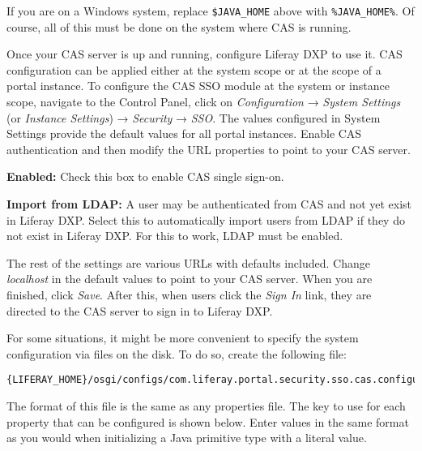 If you are on a Windows system, replace \texttt{\$JAVA\_HOME} above with
\texttt{\%JAVA\_HOME\%}. Of course, all of this must be done on the
system where CAS is running.

Once your CAS server is up and running, configure Liferay DXP to use it.
CAS configuration can be applied either at the system scope or at the
scope of a portal instance. To configure the CAS SSO module at the
system or instance scope, navigate to the Control Panel, click on
\emph{Configuration} → \emph{System Settings} (or \emph{Instance
Settings}) → \emph{Security} → \emph{SSO}. The values configured in
System Settings provide the default values for all portal instances.
Enable CAS authentication and then modify the URL properties to point to
your CAS server.

\textbf{Enabled:} Check this box to enable CAS single sign-on.

\textbf{Import from LDAP:} A user may be authenticated from CAS and not
yet exist in Liferay DXP. Select this to automatically import users from
LDAP if they do not exist in Liferay DXP. For this to work, LDAP must be
enabled.

The rest of the settings are various URLs with defaults included. Change
\emph{localhost} in the default values to point to your CAS server. When
you are finished, click \emph{Save}. After this, when users click the
\emph{Sign In} link, they are directed to the CAS server to sign in to
Liferay DXP.

For some situations, it might be more convenient to specify the system
configuration via files on the disk. To do so, create the following
file:

\begin{verbatim}
{LIFERAY_HOME}/osgi/configs/com.liferay.portal.security.sso.cas.configuration.CASConfiguration.cfg
\end{verbatim}

The format of this file is the same as any properties file. The key to
use for each property that can be configured is shown below. Enter
values in the same format as you would when initializing a Java
primitive type with a literal value.

